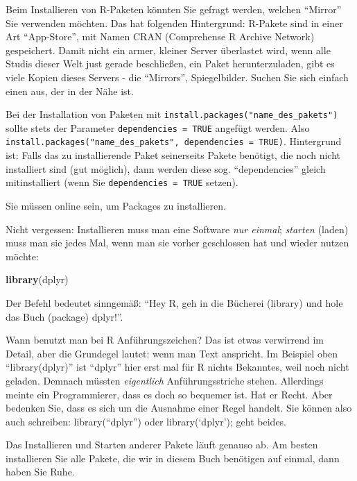 \documentclass[12pt,ngerman,]{book}
\newenvironment{Shaded}{\begin{snugshade}}{\end{snugshade}}
\newcommand{\KeywordTok}[1]{\textcolor[rgb]{0.13,0.29,0.53}{\textbf{{#1}}}}
\newcommand{\NormalTok}[1]{{#1}}
\renewenvironment{Shaded}{\begin{kframe}}{\end{kframe}}
\let\BeginKnitrBlock\begin \let\EndKnitrBlock\end
\begin{document}
\BeginKnitrBlock{rmdcaution}
Beim Installieren von R-Paketen könnten Sie gefragt werden, welchen
``Mirror'' Sie verwenden möchten. Das hat folgenden Hintergrund:
R-Pakete sind in einer Art ``App-Store'', mit Namen CRAN (Comprehense R
Archive Network) gespeichert. Damit nicht ein armer, kleiner Server
überlastet wird, wenn alle Studis dieser Welt just gerade beschließen,
ein Paket herunterzuladen, gibt es viele Kopien dieses Servers - die
``Mirrors'', Spiegelbilder. Suchen Sie sich einfach einen aus, der in
der Nähe ist.
\EndKnitrBlock{rmdcaution}

Bei der Installation von Paketen mit
\texttt{install.packages("name\_des\_pakets")} sollte stets der
Parameter \texttt{dependencies\ =\ TRUE} angefügt werden. Also
\texttt{install.packages("name\_des\_pakets",\ dependencies\ =\ TRUE)}.
Hintergrund ist: Falls das zu installierende Paket seinerseits Pakete
benötigt, die noch nicht installiert sind (gut möglich), dann werden
diese sog. ``dependencies'' gleich mitinstalliert (wenn Sie
\texttt{dependencies\ =\ TRUE} setzen).

Sie müssen online sein, um Packages zu installieren.

Nicht vergessen: Installieren muss man eine Software \emph{nur einmal};
\emph{starten} (laden) muss man sie jedes Mal, wenn man sie vorher
geschlossen hat und wieder nutzen möchte:

\begin{Shaded}
\begin{Highlighting}[]
\KeywordTok{library}\NormalTok{(dplyr) }
\end{Highlighting}
\end{Shaded}

Der Befehl bedeutet sinngemäß: ``Hey R, geh in die Bücherei (library)
und hole das Buch (package) dplyr!''.

\BeginKnitrBlock{rmdcaution}
Wann benutzt man bei R Anführungszeichen? Das ist etwas verwirrend im
Detail, aber die Grundegel lautet: wenn man Text anspricht. Im Beispiel
oben ``library(dplyr)'' ist ``dplyr'' hier erst mal für R nichts
Bekanntes, weil noch nicht geladen. Demnach müssten \emph{eigentlich}
Anführungsstriche stehen. Allerdings meinte ein Programmierer, dass es
doch so bequemer ist. Hat er Recht. Aber bedenken Sie, dass es sich um
die Ausnahme einer Regel handelt. Sie können also auch schreiben:
library(``dplyr'') oder library(`dplyr'); geht beides.
\EndKnitrBlock{rmdcaution}

Das Installieren und Starten anderer Pakete läuft genauso ab. Am besten
installieren Sie alle Pakete, die wir in diesem Buch benötigen auf
einmal, dann haben Sie Ruhe.
\end{document}
